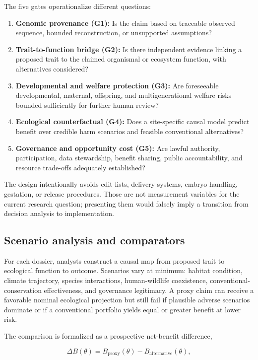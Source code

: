\documentclass[conference]{IEEEtran}
\begin{document}
The five gates operationalize different questions:

\begin{enumerate}[leftmargin=*,nosep]
\item \textbf{Genomic provenance (G1):} Is the claim based on traceable observed sequence, bounded reconstruction, or unsupported assumptions?
\item \textbf{Trait-to-function bridge (G2):} Is there independent evidence linking a proposed trait to the claimed organismal or ecosystem function, with alternatives considered?
\item \textbf{Developmental and welfare protection (G3):} Are foreseeable developmental, maternal, offspring, and multigenerational welfare risks bounded sufficiently for further human review?
\item \textbf{Ecological counterfactual (G4):} Does a site-specific causal model predict benefit over credible harm scenarios and feasible conventional alternatives?
\item \textbf{Governance and opportunity cost (G5):} Are lawful authority, participation, data stewardship, benefit sharing, public accountability, and resource trade-offs adequately established?
\end{enumerate}

The design intentionally avoids edit lists, delivery systems, embryo handling, gestation, or release procedures. Those are not measurement variables for the current research question; presenting them would falsely imply a transition from decision analysis to implementation.

\subsection{Scenario analysis and comparators}

For each dossier, analysts construct a causal map from proposed trait to ecological function to outcome. Scenarios vary at minimum: habitat condition, climate trajectory, species interactions, human-wildlife coexistence, conventional-conservation effectiveness, and governance legitimacy. A proxy claim can receive a favorable nominal ecological projection but still fail if plausible adverse scenarios dominate or if a conventional portfolio yields equal or greater benefit at lower risk.

The comparison is formalized as a prospective net-benefit difference,

\begin{equation}
\Delta B(\theta)=B_{\mathrm{proxy}}(\theta)-B_{\mathrm{alternative}}(\theta),
\label{eq:benefit}
\end{equation}
\end{document}
